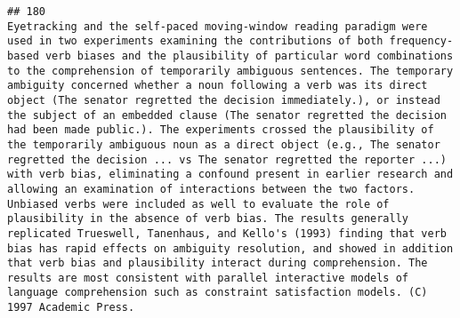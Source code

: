 \documentclass[
  english,
  man]{apa6}
\begin{document}
\begin{verbatim}
## 180                                                                                                                                                                                                                                                                                                                                                                                                                                                                                                                                                                                                                                                                                                                                                                                                                                                                                                                                                                                                                                                                                                                                                                                                                                                                                                         Eyetracking and the self-paced moving-window reading paradigm were used in two experiments examining the contributions of both frequency-based verb biases and the plausibility of particular word combinations to the comprehension of temporarily ambiguous sentences. The temporary ambiguity concerned whether a noun following a verb was its direct object (The senator regretted the decision immediately.), or instead the subject of an embedded clause (The senator regretted the decision had been made public.). The experiments crossed the plausibility of the temporarily ambiguous noun as a direct object (e.g., The senator regretted the decision ... vs The senator regretted the reporter ...) with verb bias, eliminating a confound present in earlier research and allowing an examination of interactions between the two factors. Unbiased verbs were included as well to evaluate the role of plausibility in the absence of verb bias. The results generally replicated Trueswell, Tanenhaus, and Kello's (1993) finding that verb bias has rapid effects on ambiguity resolution, and showed in addition that verb bias and plausibility interact during comprehension. The results are most consistent with parallel interactive models of language comprehension such as constraint satisfaction models. (C) 1997 Academic Press.

\end{verbatim}
\end{document}
